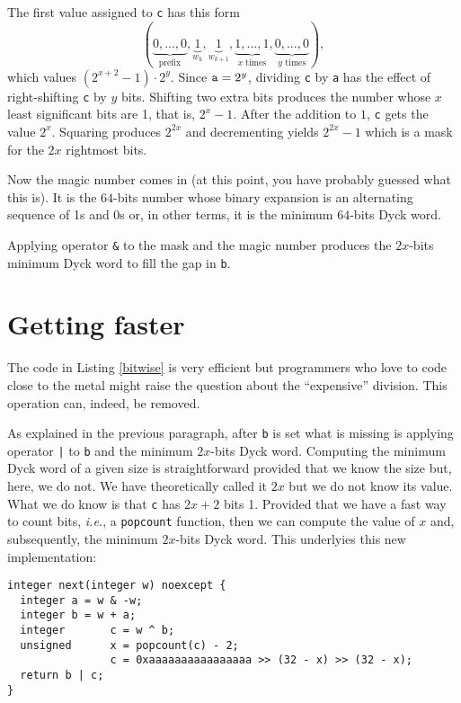 \documentclass[a4paper]{article}
\begin{document}
The first value assigned to \verb!c! has this form
\[
(\underbrace{0, ..., 0}_{\text{prefix}}, \underbrace{1}_{w_k}, \underbrace{1}_{w_{k + 1}}, \underbrace{1, ..., 1}_{x\text{ times}}, \underbrace{0, ..., 0}_{y\text{ times}}),
\]
which values $(2^{x + 2} - 1)\cdot 2^y$.
Since $\verb!a! = 2^y$, dividing \verb!c! by \verb!a! has the effect of right-shifting \verb!c! by $y$ bits.
Shifting two extra bits produces the number whose $x$ least significant bits are 1, that is, $2^x - 1$.
After the addition to $1$, \verb!c! gets the value $2^x$.
Squaring produces $2^{2x}$ and decrementing yields $2^{2x} - 1$ which is a mask for the $2x$ rightmost bits.

Now the magic number comes in (at this point, you have probably guessed what this is).
It is the $64$-bits number whose binary expansion is an alternating sequence of 1s and 0s or, in other terms, it is the minimum $64$-bits Dyck word.

Applying operator \verb!&! to the mask and the magic number produces the $2x$-bits minimum Dyck word to fill the gap in \verb!b!.



\section{Getting faster}
\label{Sec:Getting}

The code in Listing \ref{bitwise} is very efficient but programmers who love to code close to the metal might raise the question about the ``expensive'' division.
This operation can, indeed, be removed.

As explained in the previous paragraph, after \verb!b! is set what is missing is applying operator \verb!|! to \verb!b! and the minimum $2x$-bits Dyck word.
Computing the minimum Dyck word of a given size is straightforward provided that we know the size but, here, we do not.
We have theoretically called it $2x$ but we do not know its value.
What we do know is that \verb!c! has $2x + 2$ bits 1.
Provided that we have a fast way to count bits, {\it i.e.}, a \verb!popcount! function, then we can compute the value of $x$ and, subsequently, the minimum $2x$-bits Dyck word.
This underlyies this new implementation:
\\
\begin{lstlisting}
integer next(integer w) noexcept {
  integer a = w & -w;
  integer b = w + a;
  integer       c = w ^ b;
  unsigned      x = popcount(c) - 2;
                c = 0xaaaaaaaaaaaaaaaa >> (32 - x) >> (32 - x);
  return b | c;
}
\end{lstlisting}
\end{document}
